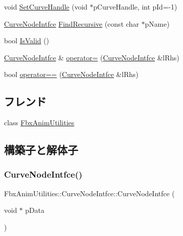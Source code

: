 \begin{DoxyCompactItemize}
void \hyperlink{class_fbx_anim_utilities_1_1_curve_node_intfce_ae85136906c93fa6354ea8bedfd4529f3}{Set\+Curve\+Handle} (void $\ast$p\+Curve\+Handle, int p\+Id=-\/1)
\item 
\hyperlink{class_fbx_anim_utilities_1_1_curve_node_intfce}{Curve\+Node\+Intfce} \hyperlink{class_fbx_anim_utilities_1_1_curve_node_intfce_a569764d9e78475b8742595ea7865c3e3}{Find\+Recursive} (const char $\ast$p\+Name)
\item 
bool \hyperlink{class_fbx_anim_utilities_1_1_curve_node_intfce_aa8a503d6101b62e96c17366ed35fedfd}{Is\+Valid} ()
\item 
\hyperlink{class_fbx_anim_utilities_1_1_curve_node_intfce}{Curve\+Node\+Intfce} \& \hyperlink{class_fbx_anim_utilities_1_1_curve_node_intfce_a3f44f01d0df459b322ef34607b41d792}{operator=} (\hyperlink{class_fbx_anim_utilities_1_1_curve_node_intfce}{Curve\+Node\+Intfce} \&l\+Rhs)
\item 
bool \hyperlink{class_fbx_anim_utilities_1_1_curve_node_intfce_a705d0c9ec97ebcdeb6bb01375ba5cc5b}{operator==} (\hyperlink{class_fbx_anim_utilities_1_1_curve_node_intfce}{Curve\+Node\+Intfce} \&l\+Rhs)
\end{DoxyCompactItemize}
\subsection*{フレンド}
\begin{DoxyCompactItemize}
\item 
class \hyperlink{class_fbx_anim_utilities_1_1_curve_node_intfce_aeacafd3baeb97bc8863c00bb6de0073d}{Fbx\+Anim\+Utilities}
\end{DoxyCompactItemize}


\subsection{構築子と解体子}
\mbox{\label{class_fbx_anim_utilities_1_1_curve_node_intfce_a6f3f8be16037c0e517ca91580c2babad}} 
\subsubsection{\texorpdfstring{Curve\+Node\+Intfce()}{CurveNodeIntfce()}}
{\footnotesize\ttfamily Fbx\+Anim\+Utilities\+::\+Curve\+Node\+Intfce\+::\+Curve\+Node\+Intfce (\begin{DoxyParamCaption}\item[{void $\ast$}]{p\+Data }\end{DoxyParamCaption})}


